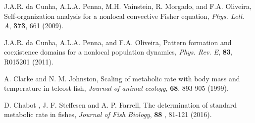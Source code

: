 \documentclass[12pt]{iopart}
\begin{document}
\begin{thebibliography}{100}
{ {J.A.R. da Cunha, A.L.A. Penna, M.H. Vainstein, R. Morgado, and F.A. Oliveira}, {Self-organization analysis for a nonlocal convective Fisher equation}, \textit{Phys. Lett. A}, \textbf{373}, 661 {(2009)}.

 {J.A.R. da Cunha, A.L.A. Penna, and F.A. Oliveira}, {Pattern formation and coexistence domains for a nonlocal population dynamics}, \textit{Phys. Rev. E}, \textbf{83}, {R015201} {(2011)}.

 { A. Clarke and  N. M. Johnston}, {Scaling of metabolic rate with body mass and temperature in teleost fish}, \textit{Journal of animal ecology}, \textbf{68},  893-905 (1999).}

 {D. Chabot , J. F. Steffesen and A. P. Farrell}, {The determination of standard metabolic rate in fishes}, \textit{Journal of Fish Biology}, \textbf{88} , 81-121 (2016).

\end{thebibliography}
\end{document}
